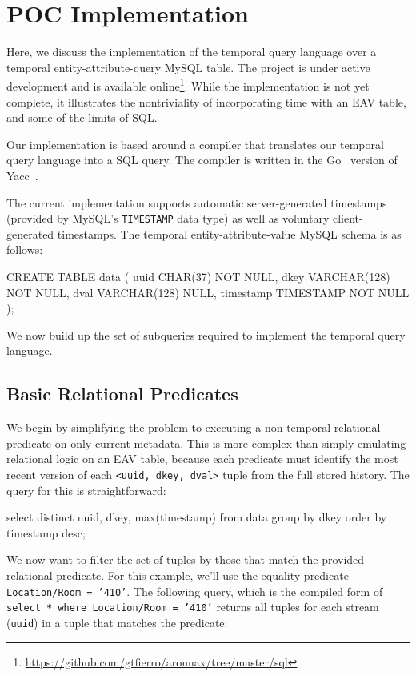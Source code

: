 \section{POC Implementation} \label{section:implementation}

Here, we discuss the implementation of the temporal query language over a
temporal entity-attribute-query MySQL table. The project is under active
development and is available
online\footnote{\url{https://github.com/gtfierro/aronnax/tree/master/sql}}.
While the implementation is not yet complete, it illustrates the nontriviality
of incorporating time with an EAV table, and some of the limits of SQL.

Our implementation is based around a compiler that translates our temporal
query language into a SQL query. The compiler is written in the Go~\cite{go} version
of Yacc~\cite{johnson1975yacc}\cite{goyacc}. 

The current implementation supports automatic server-generated timestamps (provided by MySQL's \texttt{TIMESTAMP}
data type) as well as voluntary client-generated timestamps. The temporal entity-attribute-value MySQL schema is as
follows:
\begin{sqlcode}
CREATE TABLE data
(
    uuid CHAR(37) NOT NULL,
    dkey VARCHAR(128) NOT NULL,
    dval VARCHAR(128) NULL,
    timestamp TIMESTAMP NOT NULL
);
\end{sqlcode}

We now build up the set of subqueries required to implement the temporal query language.

\subsection{Basic Relational Predicates}

We begin by simplifying the problem to executing a non-temporal relational predicate on only current
metadata. This is more complex than simply emulating relational logic on an EAV table, because each
predicate must identify the most recent version of each \texttt{<uuid, dkey, dval>} tuple from the full
stored history. The query for this is straightforward:

\begin{sqlcode}
select distinct uuid, dkey, max(timestamp) 
from data 
group by dkey order by timestamp desc;
\end{sqlcode}

We now want to filter the set of tuples by those that match the provided relational predicate. For this
example, we'll use the equality predicate \texttt{Location/Room = '410'}. The following query, which is
the compiled form of \texttt{select * where Location/Room = '410'} returns
all tuples for each stream (\texttt{uuid}) in a tuple that matches the predicate:


